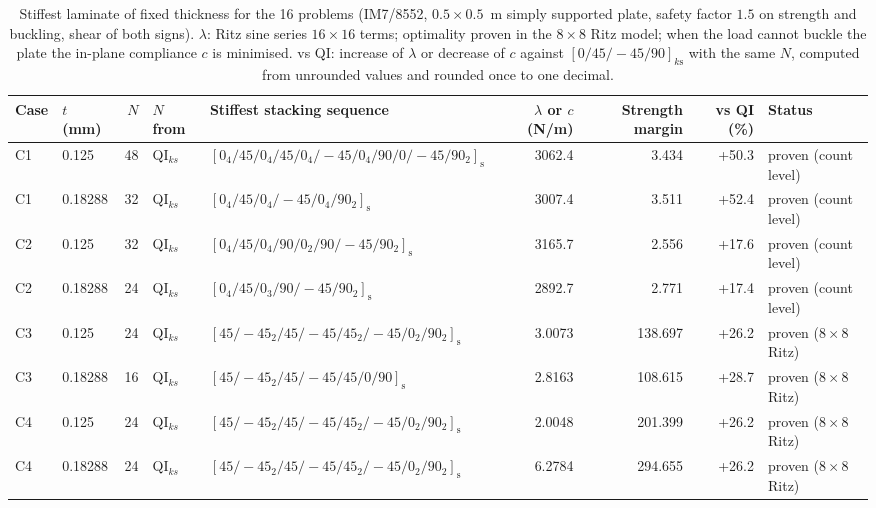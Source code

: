 \begin{table}[t]
\centering
\footnotesize
\caption{Stiffest laminate of fixed thickness for the 16 problems (IM7/8552, $0.5 \times 0.5$~m simply supported plate, safety factor $1.5$ on strength and buckling, shear of both signs). $\lambda$: Ritz sine series $16 \times 16$ terms; optimality proven in the $8 \times 8$ Ritz model; when the load cannot buckle the plate the in-plane compliance $c$ is minimised. vs QI: increase of $\lambda$ or decrease of $c$ against $[0/45/-45/90]_{k\mathrm{s}}$ with the same $N$, computed from unrounded values and rounded once to one decimal.}
\label{tab:stiffness16}
\begin{tabular}{llrlp{62mm}rrrl}
\toprule
Case & $t$ (mm) & $N$ & $N$ from & Stiffest stacking sequence & $\lambda$ or $c$ (N/m) & Strength margin & vs QI (\%) & Status \\
\midrule
C1 & 0.125 & 48 & QI$_{ks}$ & $[0_{4}/45/0_{4}/45/0_{4}/-45/0_{4}/90/0/-45/90_{2}]_{\mathrm{s}}$ & 3062.4 & 3.434 & +50.3 & proven (count level) \\
C1 & 0.18288 & 32 & QI$_{ks}$ & $[0_{4}/45/0_{4}/-45/0_{4}/90_{2}]_{\mathrm{s}}$ & 3007.4 & 3.511 & +52.4 & proven (count level) \\
C2 & 0.125 & 32 & QI$_{ks}$ & $[0_{4}/45/0_{4}/90/0_{2}/90/-45/90_{2}]_{\mathrm{s}}$ & 3165.7 & 2.556 & +17.6 & proven (count level) \\
C2 & 0.18288 & 24 & QI$_{ks}$ & $[0_{4}/45/0_{3}/90/-45/90_{2}]_{\mathrm{s}}$ & 2892.7 & 2.771 & +17.4 & proven (count level) \\
C3 & 0.125 & 24 & QI$_{ks}$ & $[45/-45_{2}/45/-45/45_{2}/-45/0_{2}/90_{2}]_{\mathrm{s}}$ & 3.0073 & 138.697 & +26.2 & proven ($8 \times 8$ Ritz) \\
C3 & 0.18288 & 16 & QI$_{ks}$ & $[45/-45_{2}/45/-45/45/0/90]_{\mathrm{s}}$ & 2.8163 & 108.615 & +28.7 & proven ($8 \times 8$ Ritz) \\
C4 & 0.125 & 24 & QI$_{ks}$ & $[45/-45_{2}/45/-45/45_{2}/-45/0_{2}/90_{2}]_{\mathrm{s}}$ & 2.0048 & 201.399 & +26.2 & proven ($8 \times 8$ Ritz) \\
C4 & 0.18288 & 24 & QI$_{ks}$ & $[45/-45_{2}/45/-45/45_{2}/-45/0_{2}/90_{2}]_{\mathrm{s}}$ & 6.2784 & 294.655 & +26.2 & proven ($8 \times 8$ Ritz) \\

\end{tabular}
\end{table}
